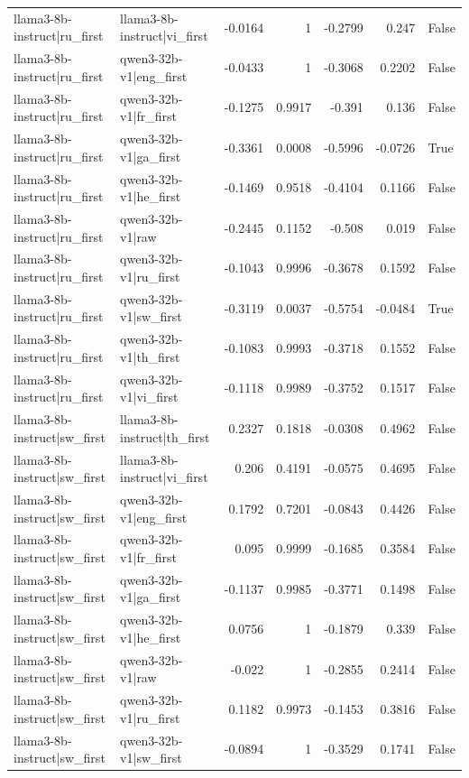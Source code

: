 \begin{table}
\begin{tabular}{l l r r r r l}
llama3-8b-instruct|ru_first & llama3-8b-instruct|vi_first & -0.0164 & 1 & -0.2799 & 0.247 & False \\
llama3-8b-instruct|ru_first & qwen3-32b-v1|eng_first & -0.0433 & 1 & -0.3068 & 0.2202 & False \\
llama3-8b-instruct|ru_first & qwen3-32b-v1|fr_first & -0.1275 & 0.9917 & -0.391 & 0.136 & False \\
llama3-8b-instruct|ru_first & qwen3-32b-v1|ga_first & -0.3361 & 0.0008 & -0.5996 & -0.0726 & True \\
llama3-8b-instruct|ru_first & qwen3-32b-v1|he_first & -0.1469 & 0.9518 & -0.4104 & 0.1166 & False \\
llama3-8b-instruct|ru_first & qwen3-32b-v1|raw & -0.2445 & 0.1152 & -0.508 & 0.019 & False \\
llama3-8b-instruct|ru_first & qwen3-32b-v1|ru_first & -0.1043 & 0.9996 & -0.3678 & 0.1592 & False \\
llama3-8b-instruct|ru_first & qwen3-32b-v1|sw_first & -0.3119 & 0.0037 & -0.5754 & -0.0484 & True \\
llama3-8b-instruct|ru_first & qwen3-32b-v1|th_first & -0.1083 & 0.9993 & -0.3718 & 0.1552 & False \\
llama3-8b-instruct|ru_first & qwen3-32b-v1|vi_first & -0.1118 & 0.9989 & -0.3752 & 0.1517 & False \\
llama3-8b-instruct|sw_first & llama3-8b-instruct|th_first & 0.2327 & 0.1818 & -0.0308 & 0.4962 & False \\
llama3-8b-instruct|sw_first & llama3-8b-instruct|vi_first & 0.206 & 0.4191 & -0.0575 & 0.4695 & False \\
llama3-8b-instruct|sw_first & qwen3-32b-v1|eng_first & 0.1792 & 0.7201 & -0.0843 & 0.4426 & False \\
llama3-8b-instruct|sw_first & qwen3-32b-v1|fr_first & 0.095 & 0.9999 & -0.1685 & 0.3584 & False \\
llama3-8b-instruct|sw_first & qwen3-32b-v1|ga_first & -0.1137 & 0.9985 & -0.3771 & 0.1498 & False \\
llama3-8b-instruct|sw_first & qwen3-32b-v1|he_first & 0.0756 & 1 & -0.1879 & 0.339 & False \\
llama3-8b-instruct|sw_first & qwen3-32b-v1|raw & -0.022 & 1 & -0.2855 & 0.2414 & False \\
llama3-8b-instruct|sw_first & qwen3-32b-v1|ru_first & 0.1182 & 0.9973 & -0.1453 & 0.3816 & False \\
llama3-8b-instruct|sw_first & qwen3-32b-v1|sw_first & -0.0894 & 1 & -0.3529 & 0.1741 & False \\

\end{tabular}
\end{table}

